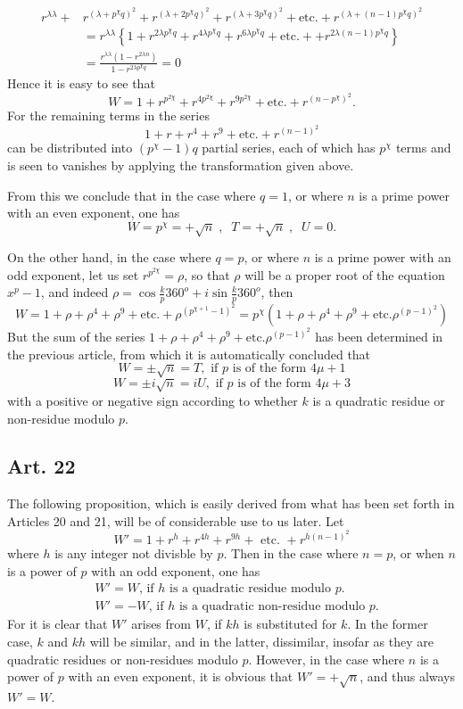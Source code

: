 \documentclass{book}
\theoremstyle{plain}
\theoremstyle{remark}
\begin{document}
\begin{align*} r^{\lambda \lambda} + &r^{(\lambda+p^{\chi}q)^2} + r^{(\lambda+2p^{\chi}q)^2} + r^{(\lambda+3p^{\chi}q)^2}+\textrm{etc.}+ r^{(\lambda+(n-1)p^{\chi}q)^2} \\
&= r^{\lambda\lambda}\left\{1+r^{2\lambda p^\chi q} +r^{4\lambda p^\chi q} +r^{6\lambda p^\chi q} +\textrm{etc.}++r^{2\lambda (n-1)p^\chi q} \right\} \\
&=\frac{r^{\lambda\lambda}(1-r^{2\lambda n})}{1-r^{2\lambda p^\chi q} } = 0 
 \end{align*}
Hence it is easy to see that
\[ W = 1 + r^{p^{2\chi}} + r^{4p^{2\chi}} + r^{9p^{2\chi}} + \textrm{etc.}+r^{(n-p^{\chi})^2}. \]
For the remaining terms in the series
\[ 1 + r + r^4 + r^9 + \textrm{etc.} +r^{(n-1)^2} \]
can be distributed into $(p^{\chi}-1)q$ partial series, each of which has $p^{\chi}$ terms and is seen to vanishes by applying the transformation given above.   

From this we conclude that in the case where $q=1$, or where $n$ is a prime power with an even exponent, one has
\[ W = p^\chi = +\sqrt{n}\;,\;\; T = +\sqrt{n} \; , \; \; U = 0. \]

On the other hand, in the case where $q=p$, or where $n$ is a prime power with an odd exponent, let us set $r^{p^{2\chi}} = \rho$, so that $\rho$ will be a proper root of the equation $x^p-1$, and indeed $\rho = \cos \frac{k}{p} 360^o + i \sin \frac{k}{p} 360^o$, then 
\[ W = 1 + \rho + \rho^4 + \rho^9 + \textrm{etc.} + \rho^{(p^{\chi+1}-1)^2} = p^\chi \left(1 + \rho + \rho^4 + \rho^9 + \textrm{etc.} \rho^{(p-1)^2}\right) \]
But the sum of the series $1 + \rho + \rho^4 + \rho^9 + \textrm{etc.} \rho^{(p-1)^2}$ has been determined in the previous article, from which it is automatically concluded that
\[ W = \pm \sqrt{n} = T, \textrm{ if }p\textrm{ is of the form }4\mu+1 \]
\[ W = \pm i \sqrt{n} = iU, \textrm{ if }p\textrm{ is of the form }4\mu+3 \]
with a positive or negative sign according to whether $k$ is a quadratic residue or non-residue modulo $p$. 

\subsection*{Art. 22} 

The following proposition, which is easily derived from what has been set forth in Articles 20 and 21, will be of considerable use to us later.  Let
\[ W' = 1 + r^h + r^{4h} + r^{9h} + \textrm{ etc. } + r^{h(n-1)^2} \]
where $h$ is any integer not divisble by $p$.  Then in the case where $n=p$, or when $n$ is a power of $p$ with an odd exponent, one has
\begin{align*}
&W' = W \textrm{, if }h\textrm{ is a quadratic residue modulo }p. \\
&W' = - W \textrm{, if }h\textrm{ is a quadratic non-residue modulo }p. 
\end{align*}
For it is clear that $W'$ arises from $W$, if $kh$ is substituted for $k$.  In the former case, $k$ and $kh$ will be similar, and in the latter, dissimilar, insofar as they are quadratic residues or non-residues modulo $p$.  However, in the case where $n$ is a power of $p$ with an even exponent, it is obvious that $W' = +\sqrt{n}$, and thus always $W'=W$.
\end{document}
